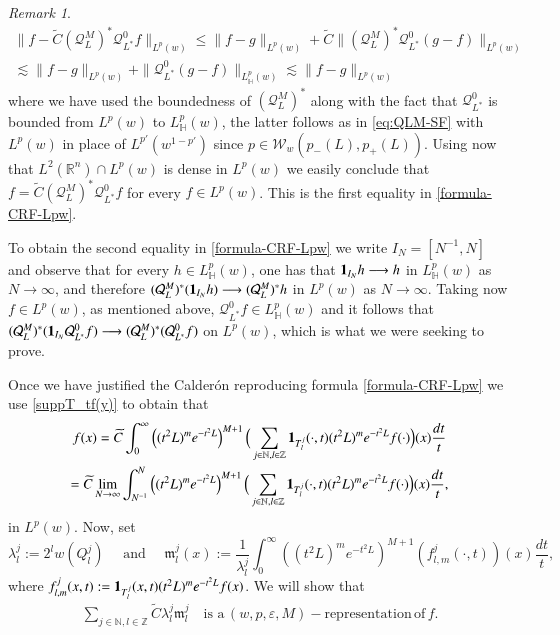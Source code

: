 \documentclass[11pt, a4paper,leqno]{amsart}
\newcommand{\mm}{\mathfrak{m}}
\renewcommand{\chi}{{\bf 1}}
\theoremstyle{plain}
\theoremstyle{definition}
\theoremstyle{remark}
\newtheorem{remark}[equation]{Remark}
\numberwithin{equation}{section}
\def \R{ \mathbb{R} }
\def \N{ \mathbb{N} }
\def \Z{ \mathbb{Z} }
\def \p{ (w,p,\varepsilon,M)-\textrm{representation}}
\begin{document}
\begin{remark}
\begin{multline*}
\big\|f- \widetilde{C}(\mathcal{Q}_L^M)^*  \mathcal{Q}_{L^*}^0 f\big\|_{L^p(w)}
\le
\|f-g\|_{L^p(w)}+ \widetilde{C}\big\|(\mathcal{Q}_L^M)^*  \mathcal{Q}_{L^*}^0 (g- f)\big\|_{L^p(w)}
\\
\lesssim
\|f-g\|_{L^p(w)}+ \|\mathcal{Q}_{L^*}^0(g-f)\|_{L_{\mathbb{H}}^p(w)}
\lesssim
\|f-g\|_{L^p(w)}
\end{multline*}
where we have used the boundedness of $(\mathcal{Q}_L^M)^*$ along with the fact that $\mathcal{Q}_{L^*}^0$ is bounded from $L^p(w)$ to $L_{\mathbb{H}}^p(w)$, the latter follows as in \eqref{eq:QLM-SF} with $L^p(w)$ in place of $L^{p'}(w^{1-p'})$ since $p\in \mathcal{W}_w(p_-(L),p_+(L))$.  Using now that $L^2(\R^n)\cap L^p(w)$ is dense in $L^p(w)$ we easily conclude that $f=\widetilde{C}(\mathcal{Q}_L^M)^*  \mathcal{Q}_{L^*}^0 f$ for every $f\in L^p(w)$. This is the first equality in \eqref{formula-CRF-Lpw}.

To obtain the second equality in \eqref{formula-CRF-Lpw} we write $I_N=[N^{-1}, N]$ and observe that for every $h\in L_{\mathbb{H}}^p(w)$, one has that $\chi_{I_{N}}h\longrightarrow h$ in $L_{\mathbb{H}}^p(w)$ as $N\to\infty$, and therefore $(\mathcal{Q}_L^M)^*(\chi_{I_{N}}h)\longrightarrow (\mathcal{Q}_L^M)^*h$ in $L^p(w)$ as $N\to\infty$. Taking now $f\in L^p(w)$, as mentioned above, $\mathcal{Q}_{L^*}^0 f\in L_{\mathbb{H}}^p(w) $ and it follows that $(\mathcal{Q}_L^M)^*(\chi_{I_{N}}\mathcal{Q}_{L^*}^0 f)\longrightarrow (\mathcal{Q}_L^M)^*(\mathcal{Q}_{L^*}^0 f)$ on $L^p(w)$, which is what we were seeking to prove.
\end{remark}

Once we have justified the Calder{\'o}n reproducing formula \eqref{formula-CRF-Lpw} we use 
\eqref{suppT_tf(y)} to obtain
that
\begin{multline}\label{Calderonformula}
f(x)=\widetilde{C}\int_{0}^{\infty}\left((t^2L)^me^{-t^2L}\right)^{M+1}
\Big(\sum_{j\in \N, l\in \Z}\chi_{T_l^j}(\cdot,t)(t^2L)^me^{-t^2L}f(\cdot)\Big)(x)\frac{dt}{t}
\\
=\widetilde{C}\lim_{N\rightarrow \infty}
\int_{N^{-1}}^{N}\left((t^2L)^me^{-t^2L}\right)^{M+1}
\Big(\sum_{j\in \N, l\in \Z}\chi_{T_l^j}(\cdot,t)(t^2L)^me^{-t^2L}f(\cdot)\Big)(x)\frac{dt}{t},
\end{multline}
in $L^p(w)$.
Now, set
$$
\lambda_{l}^j:=2^lw(Q_l^j)\quad \textrm{ and } \quad \mm_{l}^{j}(x):=\frac{1}{\lambda_{l}^j}
\int_{0}^{\infty}\left((t^2L)^me^{-t^2L}\right)^{M+1}
\left({f}_{l,m}^j(\cdot,t)\right)(x)\frac{dt}{t},
$$
where ${f}_{l,m}^j(x,t):=\chi_{T_l^j}(x,t)(t^2L)^me^{-t^2L}f(x)$.
We will show that
\begin{align}\label{fNp}
\sum_{j\in \N, l\in \Z}\widetilde{C}\lambda_l^j\mm_{l}^{j}\quad
\textrm{is a}\, \p\, \textrm{of} \, f.
\end{align}
\end{document}
